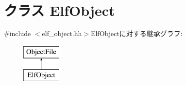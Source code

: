 \hypertarget{classElfObject}{
\section{クラス ElfObject}
\label{classElfObject}
}


{\ttfamily \#include $<$elf\_\-object.hh$>$}ElfObjectに対する継承グラフ:\begin{figure}[H]
\begin{center}
\leavevmode
\includegraphics[height=2cm]{classElfObject}
\end{center}
\end{figure}
